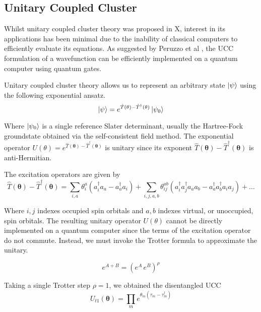 
\subsection{Unitary Coupled Cluster}

Whilst unitary coupled cluster theory was proposed in X, interest in its applications has been minimal due to the inability of classical computers to efficiently evaluate its equations. As suggested by Peruzzo et al \cite{Peruzzo2014}, the UCC formulation of a wavefunction can be efficiently implemented on a quantum computer using quantum gates.

Unitary coupled cluster theory allows us to represent an arbitrary state $\ket\psi$ using the following exponential ansatz.
\begin{equation*}
    \ket\psi = e^{\hat T(\mathbf{\theta}) - \hat T^\dagger(\mathbf{\theta})} \ket{\psi_0}
\end{equation*}

Where $\ket{\psi_0}$ is a single reference Slater determinant, usually the Hartree-Fock groundstate obtained via the self-consistent field method. The exponential operator $U(\theta) = e^{\hat T(\mathbf{\theta}) - \hat T^\dagger(\mathbf{\theta})}$ is unitary since its exponent $\hat T(\mathbf{\theta}) - \hat T^\dagger(\mathbf{\theta})$ is anti-Hermitian.

The excitation operators are given by
\begin{equation*}
\hat T(\mathbf{\theta}) - \hat T^{\dagger}(\mathbf{\theta}) =
\sum_{i, a} \theta^a_i (a^\dagger_i a_a - a^\dagger_a a_i) + 
\sum_{i, j, a, b} \theta^{ab}_{ij} (a^\dagger_i a^\dagger_j a_a a_b - a^\dagger_a a^\dagger_b a_i a_j) + \dots
\end{equation*}

Where $i, j$ indexes occupied spin orbitals and $a, b$ indexes virtual, or unoccupied, spin orbitals. The resulting unitary operator $U(\theta)$ cannot be directly implemented on a quantum computer since the terms of the excitation operator do not commute. Instead, we must invoke the Trotter formula to approximate the unitary.

\begin{equation*}
    e^{A+B} = (e^A \, e^B)^\rho
\end{equation*}

Taking a single Trotter step $\rho=1$, we obtained the disentangled UCC
\begin{equation}
    U_{t1}(\mathbf\theta) = \prod_m e^{\theta_m (\tau_m - \tau_m^\dagger)}
\end{equation}

